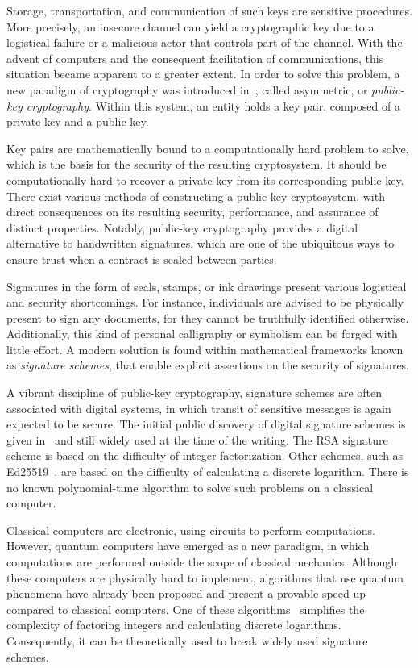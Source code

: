 \documentclass[12pt, a4paper, oneside]{memoir}
\theoremstyle{definition}
\begin{document}
Storage, transportation, and communication of such keys are sensitive procedures. More precisely, an insecure channel can yield a cryptographic key due to a logistical failure or a malicious actor that controls part of the channel. With the advent of computers and the consequent facilitation of communications, this situation became apparent to a greater extent. In order to solve this problem, a new paradigm of cryptography was introduced in~\cite{Diffie:197611}, called asymmetric, or \emph{public-key cryptography}. Within this system, an entity holds a key pair, composed of a private key and a public key.

Key pairs are mathematically bound to a computationally hard problem to solve, which is the basis for the security of the resulting cryptosystem. It should be computationally hard to recover a private key from its corresponding public key. There exist various methods of constructing a public-key cryptosystem, with direct consequences on its resulting security, performance, and assurance of distinct properties. Notably, public-key cryptography provides a digital alternative to handwritten signatures, which are one of the ubiquitous ways to ensure trust when a contract is sealed between parties.

Signatures in the form of seals, stamps, or ink drawings present various logistical and security shortcomings. For instance, individuals are advised to be physically present to sign any documents, for they cannot be truthfully identified otherwise. Additionally, this kind of personal calligraphy or symbolism can be forged with little effort. A modern solution is found within mathematical frameworks known as \emph{signature schemes}, that enable explicit assertions on the security of signatures.

A vibrant discipline of public-key cryptography, signature schemes are often associated with digital systems, in which transit of sensitive messages is again expected to be secure. The initial public discovery of digital signature schemes is given in~\cite{Rivest:197802} and still widely used at the time of the writing. The RSA signature scheme is based on the difficulty of integer factorization. Other schemes, such as Ed25519~\cite{Bernstein:201208}, are based on the difficulty of calculating a discrete logarithm. There is no known polynomial-time algorithm to solve such problems on a classical computer.

Classical computers are electronic, using circuits to perform computations. However, quantum computers have emerged as a new paradigm, in which computations are performed outside the scope of classical mechanics. Although these computers are physically hard to implement, algorithms that use quantum phenomena have already been proposed and present a provable speed-up compared to classical computers. One of these algorithms~\cite{Shor:199710} simplifies the complexity of factoring integers and calculating discrete logarithms. Consequently, it can be theoretically used to break widely used signature schemes.
\end{document}

